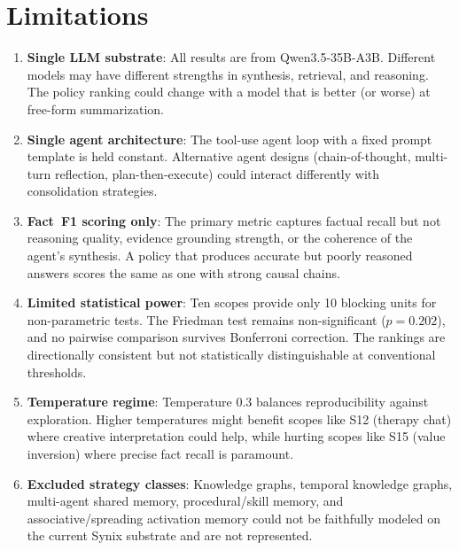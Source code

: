\documentclass[11pt,a4paper]{article}
\begin{document}
\section{Limitations}

\begin{enumerate}
    \item \textbf{Single LLM substrate}: All results are from Qwen3.5-35B-A3B. Different models may have different strengths in synthesis, retrieval, and reasoning. The policy ranking could change with a model that is better (or worse) at free-form summarization.

    \item \textbf{Single agent architecture}: The tool-use agent loop with a fixed prompt template is held constant. Alternative agent designs (chain-of-thought, multi-turn reflection, plan-then-execute) could interact differently with consolidation strategies.

    \item \textbf{Fact~F1 scoring only}: The primary metric captures factual recall but not reasoning quality, evidence grounding strength, or the coherence of the agent's synthesis. A policy that produces accurate but poorly reasoned answers scores the same as one with strong causal chains.

    \item \textbf{Limited statistical power}: Ten scopes provide only 10 blocking units for non-parametric tests. The Friedman test remains non-significant ($p = 0.202$), and no pairwise comparison survives Bonferroni correction. The rankings are directionally consistent but not statistically distinguishable at conventional thresholds.

    \item \textbf{Temperature regime}: Temperature 0.3 balances reproducibility against exploration. Higher temperatures might benefit scopes like S12 (therapy chat) where creative interpretation could help, while hurting scopes like S15 (value inversion) where precise fact recall is paramount.

    \item \textbf{Excluded strategy classes}: Knowledge graphs, temporal knowledge graphs, multi-agent shared memory, procedural/skill memory, and associative/spreading activation memory could not be faithfully modeled on the current Synix substrate and are not represented.
\end{enumerate}
\end{document}
